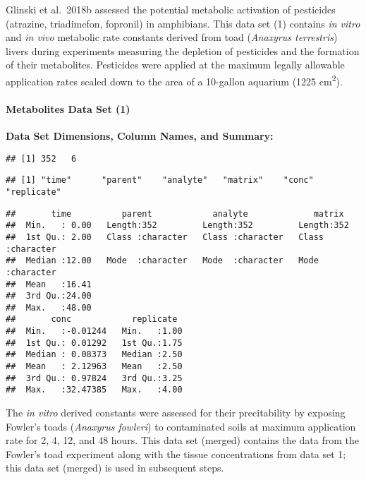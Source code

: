 \documentclass[
]{article}
\begin{document}
Glinski et al.~2018b assessed the potential metabolic activation of
pesticides (atrazine, triadimefon, fopronil) in amphibians. This data
set (1) contains \emph{in vitro} and \emph{in vivo} metabolic rate
constants derived from toad (\emph{Anaxyrus terrestris}) livers during
experiments measuring the depletion of pesticides and the formation of
their metabolites. Pesticides were applied at the maximum legally
allowable application rates scaled down to the area of a 10-gallon
aquarium (1225 cm\textsuperscript{2}).

\hypertarget{metabolites-data-set-1}{%
\paragraph{\texorpdfstring{\textbf{Metabolites Data Set
(1)}}{Metabolites Data Set (1)}}\label{metabolites-data-set-1}}

\textbf{Data Set Dimensions, Column Names, and Summary:}

\begin{verbatim}
## [1] 352   6
\end{verbatim}

\begin{verbatim}
## [1] "time"      "parent"    "analyte"   "matrix"    "conc"      "replicate"
\end{verbatim}

\begin{verbatim}
##       time          parent            analyte             matrix         
##  Min.   : 0.00   Length:352         Length:352         Length:352        
##  1st Qu.: 2.00   Class :character   Class :character   Class :character  
##  Median :12.00   Mode  :character   Mode  :character   Mode  :character  
##  Mean   :16.41                                                           
##  3rd Qu.:24.00                                                           
##  Max.   :48.00                                                           
##       conc            replicate   
##  Min.   :-0.01244   Min.   :1.00  
##  1st Qu.: 0.01292   1st Qu.:1.75  
##  Median : 0.08373   Median :2.50  
##  Mean   : 2.12963   Mean   :2.50  
##  3rd Qu.: 0.97824   3rd Qu.:3.25  
##  Max.   :32.47385   Max.   :4.00
\end{verbatim}

The \emph{in vitro} derived constants were assessed for their
precitability by exposing Fowler's toads (\emph{Anaxyrus fowleri}) to
contaminated soils at maximum application rate for 2, 4, 12, and 48
hours. This data set (merged) contains the data from the Fowler's toad
experiment along with the tissue concentrations from data set 1; this
data set (merged) is used in subsequent steps.
\end{document}
